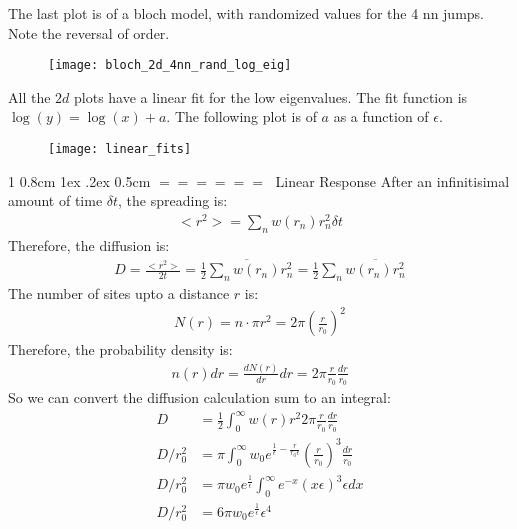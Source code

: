 \documentclass[onecolumn,fleqn,notitlepage,secnumarabic]{revtex4}
\makeatletter
\def\section{%
  \@startsection
    {section}%
    {1}%
    {\z@}%
    {0.8cm \@plus1ex \@minus .2ex}%
    {0.5cm}%
    {\Large\bf $=\!=\!=\!=\!=\!=\;$}%
}%
\makeatother
\begin{document}

The last plot is of a bloch model, with randomized values for the 4 nn jumps. Note the reversal of order.
\begin{figure}[H]
\texttt{[image: bloch\_2d\_4nn\_rand\_log\_eig]}
\end{figure}

All the $2d$ plots have a linear fit for the low eigenvalues. The fit function is $\log(y) = \log(x) + a$. The following plot is of $a$ as a function of $\epsilon$.

\begin{figure}[H]
\texttt{[image: linear\_fits]}
\end{figure}

\section{Linear Response}
After an infinitisimal amount of time $\delta t$, the spreading is:
\begin{align}   <r^2> = \sum_n w(r_n) r_n^2 \delta t \end{align}  
Therefore, the diffusion is:
\begin{align}   D = \frac{<r^2>}{2t} =  \overline{\frac{1}{2} \sum_n w(r_n) r_n^2} = \frac{1}{2}\sum_n \overline{w(r_n)r_n^2}\end{align}  
The number of sites upto a distance $r$ is:
\begin{align}   N(r) = n\cdot \pi r^2 = 2\pi\left(\frac{r}{r_0}\right)^2\end{align}  
Therefore, the probability density is:
\begin{align}   n(r)dr = \frac{dN(r)}{dr}dr = 2\pi \frac{r}{r_0}\frac{dr}{r_0}\end{align}  
So we can convert the diffusion calculation sum to an integral:
\begin{align} 
  D &= \frac{1}{2}\int_0^\infty w(r) r^2 2\pi \frac{r}{r_0} \frac{dr}{r_0} \\
  D/r_0^2 &= \pi \int_0^\infty w_0 e^{\frac{1}{\epsilon}-\frac{r}{r_0\epsilon}} \left(\frac{r}{r_0}\right)^3 \frac{dr}{r_0} \\
  D/r_0^2 &= \pi w_0 e^{\frac{1}{\epsilon}}\int_0^\infty  e^{-x} (x\epsilon)^3 \epsilon dx\\
  D/r_0^2 &= 6\pi w_0 e^{\frac{1}{\epsilon}}\epsilon^4 
\end{align}
\end{document}

